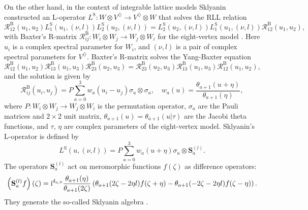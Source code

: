 On the other hand, in the context of integrable lattice models Sklyanin
constructed an L-operator $L^{\mathrm{S}}:W\otimes V^{\diamondsuit}\rightarrow V^{\diamondsuit}\otimes W$
that solves the RLL relation \cite{MR684124}
\begin{equation}
    \mathcal{R}_{12}^{\mathrm{B}}(u_{1},u_{2})
    L_{1}^{\mathrm{S}}(u_{1},(\nu,l))
    L_{2}^{\mathrm{S}}(u_{2},(\nu,l))
      =
          L_{2}^{\mathrm{S}}(u_{2},(\nu,l))
          L_{1}^{\mathrm{S}}(u_{1},(\nu,l))
          \mathcal{R}_{12}^{\mathrm{B}}(u_{1},u_{2}),
\end{equation}
with Baxter's R-matrix $\mathcal{R}_{ij}^{\mathrm{B}}:W_{i}\otimes W_{j}\rightarrow W_{j}\otimes W_{i}$
for the eight-vertex model \cite{Baxter:1971cr,Baxter:1972hz}. Here $u_{i}$
is a complex spectral parameter for $W_{i}$, and $(\nu,l)$
is a pair of complex spectral parameters for $V^{\diamondsuit}$.
Baxter's R-matrix solves the Yang-Baxter equation
\begin{equation}
    \mathcal{R}_{12}^{\mathrm{B}}(u_{1},u_{2})
    \mathcal{R}_{13}^{\mathrm{B}}(u_{1},u_{3})
    \mathcal{R}_{23}^{\mathrm{B}}(u_{2},u_{3})
      =
        \mathcal{R}_{23}^{\mathrm{B}}(u_{2},u_{3})
        \mathcal{R}_{13}^{\mathrm{B}}(u_{1},u_{3})
        \mathcal{R}_{12}^{\mathrm{B}}(u_{1},u_{2}),
\end{equation}
and the solution is given by
\begin{equation}
    \mathcal{R}_{ij}^{\mathrm{B}}(u_{i},u_{j})
      =  P\sum_{a=0}^{3}w_{a}(u_{i}-u_{j})  \sigma_{a}  \otimes  \sigma_{a},
        \quad  w_{a}(u)  =  \frac{\theta_{a+1}(u+\eta)}{\theta_{a+1}(\eta)},
\end{equation}
where $P:W_{i}\otimes W_{j}\to W_{j}\otimes W_{i}$ is the
permutation operator, $\sigma_{a}$ are the Pauli matrices and $2\times2$
unit matrix, $\theta_{a+1}(u)=\theta_{a+1}(u|\tau)$ are the Jacobi
theta functions, and $\tau,\,\eta$ are complex parameters of the
eight-vertex model. Sklyanin's L-operator is defined by
\begin{equation}
    L^{\mathrm{S}}\left(u,\left(\nu,l\right)\right)
      =  P\sum_{a=0}^{3}w_{a}(u+\eta)  \sigma_{a}  \otimes  \mathbf{S}_{a}^{(l)}.
\end{equation}
The operators $\mathbf{S}_{a}^{(l)}$ act on meromorphic functions
$f(\zeta)$ as difference operators:
\begin{equation}
    \left(\mathbf{S}_{a}^{(l)}f\right)(\zeta)
      = \mathrm{i}^{\delta_{a,0}}\frac{\theta_{a+1}(\eta)}{\theta_{a+1}(2\zeta)}
          \left(\theta_{a+1}(2\zeta-2\eta l)f(\zeta+\eta)-\theta_{a+1}(-2\zeta-2\eta l)f(\zeta-\eta)\right).
\end{equation}
They generate the so-called Sklyanin algebra \cite{MR725414}.

